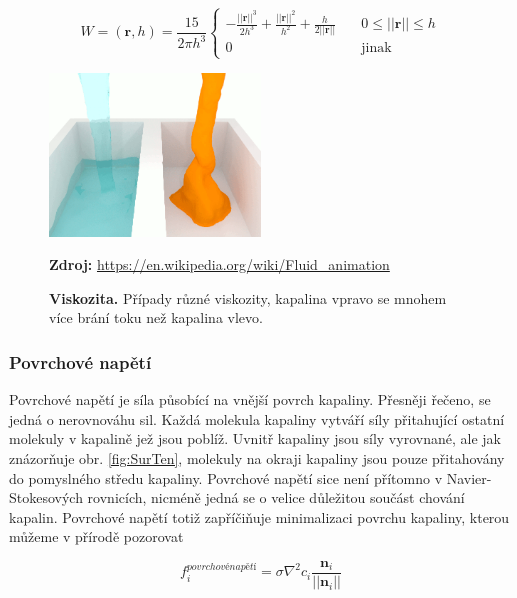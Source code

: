 \begin{equation}
    W = (\mathbf{r}, h) = \frac{15}{2 \pi h^3} 
    \begin{cases}
      -\frac{||\mathbf{r}||^3}{2h^3} + \frac{||\mathbf{r}||^2}{h^2} + \frac{h}{2||\mathbf{r}||} & \quad 0 \leq ||\mathbf{r}|| \leq h \\
      0 & \quad \text{jinak}
    \end{cases}
    \label{eq:pressureKernel}
\end{equation}

\begin{figure}[hbt]
	\centering
	\captionsetup{justification=centering}
	\includegraphics[width=0.5\textwidth]{obrazky-figures/viskozita.PNG}
	\caption{\textbf{Viskozita.} Případy různé viskozity, kapalina vpravo se mnohem více brání toku než kapalina vlevo.}
	\textbf{Zdroj: } \url{https://en.wikipedia.org/wiki/Fluid_animation}
	\label{fig:Vics}
\end{figure}

\subsubsection{Povrchové napětí}
Povrchové napětí je síla působící na vnější povrch kapaliny. Přesněji řečeno, se jedná o nerovnováhu sil. Každá molekula kapaliny vytváří síly přitahující ostatní molekuly v kapalině jež jsou poblíž. Uvnitř kapaliny jsou síly vyrovnané, ale jak znázorňuje obr. \ref{fig:SurTen}, molekuly na okraji kapaliny jsou pouze přitahovány do pomyslného středu kapaliny. Povrchové napětí sice není přítomno v Navier-Stokesových rovnicích, nicméně jedná se o velice důležitou součást chování kapalin. Povrchové napětí totiž zapříčiňuje minimalizaci povrchu kapaliny, kterou můžeme v přírodě pozorovat \cite{KelagerSPH}

\begin{equation}
    f_i^{povrchové napětí} = \sigma \nabla^2 c_i \frac{\mathbf{n}_i}{||\mathbf{n}_i||}
    \label{eq:SurfTen}
\end{equation}

